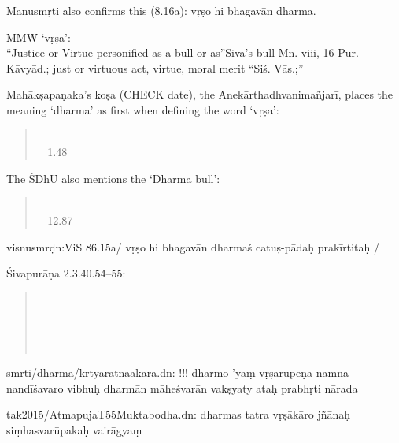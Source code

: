 \documentclass[11pt]{book}
\begin{document}
Manusmṛti also confirms this (8.16a): vṛṣo hi bhagavān dharma.

MMW `vṛṣa':\\
``Justice or Virtue personified as a bull or as''Siva's bull Mn. viii,
16 Pur. Kāvyād.; just or virtuous act, virtue, moral merit ``Siś.
Vās.;''

Mahākṣapaṇaka's koṣa (CHECK date), the Anekārthadhvanimañjarī, places
the meaning `dharma' as first when defining the word `vṛṣa':

\begin{quote}
     |\\
     || 1.48
    \end{quote}

The ŚDhU also mentions the `Dharma bull':

\begin{quote}
     |\\
     || 12.87
\end{quote}

visnusmrḍn:ViS 86.15a/ vṛṣo hi bhagavān dharmaś catuṣ-pādaḥ prakīrtitaḥ
/

Śivapurāṇa 2.3.40.54--55:

\begin{quote}
 |\\
 ||\\
 |\\
 ||
\end{quote}

smrti/dharma/krtyaratnaakara.dn: !!! dharmo 'yaṃ vṛṣarūpeṇa nāmnā
nandīśavaro vibhuḥ \textbar{} dharmān māheśvarān vakṣyaty ataḥ prabhṛti
nārada\textbar{}\textbar{}

tak2015/AtmapujaT55Muktabodha.dn: dharmas tatra vṛṣākāro jñānaḥ
siṃhasvarūpakaḥ \textbar{} vairāgyaṃ

\end{document}
